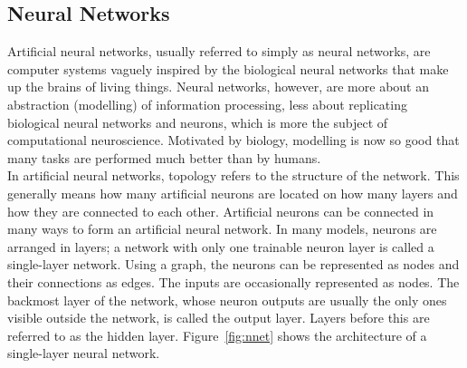 \subsection{Neural Networks}
Artificial neural networks, usually referred to simply as neural networks, are computer systems vaguely inspired by the biological neural networks that make up the brains of living things. Neural networks, however, are more about an abstraction (modelling) of information processing, less about replicating biological neural networks and neurons, which is more the subject of computational neuroscience. Motivated by biology, modelling is now so good that many tasks are performed much better than by humans. \\
In artificial neural networks, topology refers to the structure of the network. This generally means how many artificial neurons are located on how many layers and how they are connected to each other. Artificial neurons can be connected in many ways to form an artificial neural network. In many models, neurons are arranged in layers; a network with only one trainable neuron layer is called a single-layer network. 
Using a graph, the neurons can be represented as nodes and their connections as edges. The inputs are occasionally represented as nodes. 
The backmost layer of the network, whose neuron outputs are usually the only ones visible outside the network, is called the output layer. Layers before this are referred to as the hidden layer. Figure~\ref{fig:nnet} shows the architecture of a single-layer neural network.
